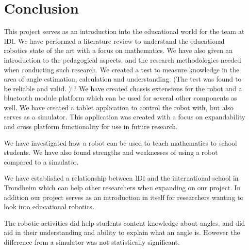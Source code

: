 \section{Conclusion}
This project serves as an introduction into the educational world for the \chirp team at IDI.
We have performed a literature review to understand the educational robotics state of the art with a focus on mathematics. 
We have also given an introduction to the pedagogical aspects, and the research methodologies needed when conducting such research.
We created a test to measure knowledge in the area of angle estimation, calculation and understanding. (The test was found to be reliable and valid. )`?
We have created chassis extensions for the robot and a bluetooth module platform which can be used for several other components as well.
We have created a tablet application to control the robot with, but also serves as a simulator. This application was created with a focus on expandability and cross platform functionality for use in future research.

We have investigated how a robot can be used to teach mathematics to school students. We have also found strengths and weaknesses of using a robot compared to a simulator. 

We have established a relationship between IDI and the international school in Trondheim which can help other researchers when expanding on our project. In addition our project serves as an introduction in itself for researchers wanting to look into educational robotics. 

The robotic activities did help students content knowledge about angles, and did aid in their understanding and ability to explain what an angle is. However the difference from a simulator was not statistically significant.